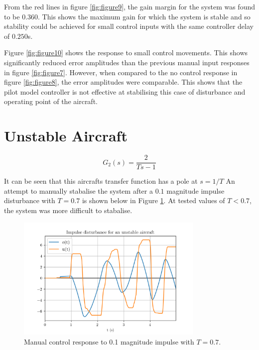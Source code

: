 \documentclass[8pt]{article}
\begin{document}
From the red lines in figure \ref{fig:figure9}, the gain margin for the system was found to be 0.360.
This shows the maximum gain for which the system is stable and so stability could be achieved for small control inputs with the same controller delay of $0.250$s.

Figure \ref{fig:figure10} shows the response to small control movements. This shows significantly reduced error amplitudes than the previous manual input responses in figure \ref{fig:figure7}.
However, when compared to the no control response in figure \ref{fig:figure8}, the error amplitudes were comparable.
This shows that the pilot model controller is not effective at stabilising this case of disturbance and operating point of the aircraft.


\section{Unstable Aircraft}

\begin{equation}
    G_2(s) = \frac{2}{Ts-1}
\end{equation}

It can be seen that this aircrafts transfer function has a pole at $s=1/T$
An attempt to manually stabalise the system after a $0.1$ magnitude impulse disturbance with $T=0.7$ is shown below in Figure \ref{fig:figure11}.
At tested values of $T<0.7$, the system was more difficult to stabalise.

\begin{figure}[H]
    \centering
    \includegraphics[width=0.8\textwidth]{figures/FIGURE_11.png}
    \caption{Manual control response to 0.1 magnitude impulse with $T=0.7$.}
    \label{fig:figure11}
\end{figure}
\end{document}
